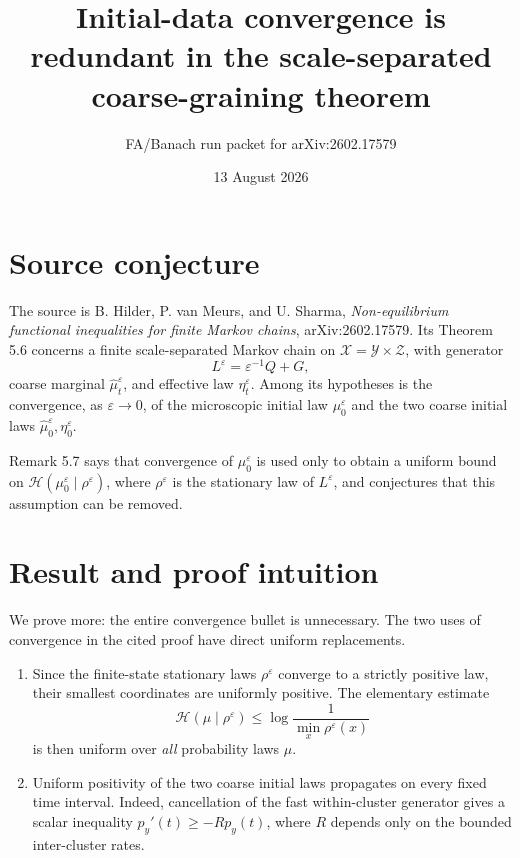 \documentclass[11pt]{article}
\title{Initial-data convergence is redundant in the scale-separated
coarse-graining theorem}
\author{FA/Banach run packet for arXiv:2602.17579}
\date{13 August 2026}
\newcommand{\Ent}{\mathcal H}
\newcommand{\X}{\mathcal X}
\newcommand{\Y}{\mathcal Y}
\newcommand{\Zs}{\mathcal Z}
\begin{document}
\maketitle

\section*{Source conjecture}

The source is B. Hilder, P. van Meurs, and U. Sharma,
\emph{Non-equilibrium functional inequalities for finite Markov chains},
arXiv:2602.17579. Its Theorem 5.6 concerns a finite scale-separated Markov
chain on \(\X=\Y\times\Zs\), with generator
\[
 L^\varepsilon=\varepsilon^{-1}Q+G,
\]
coarse marginal \(\widehat\mu_t^\varepsilon\), and effective law
\(\eta_t^\varepsilon\). Among its hypotheses is the convergence, as
\(\varepsilon\to0\), of the microscopic initial law
\(\mu_0^\varepsilon\) and the two coarse initial laws
\(\widehat\mu_0^\varepsilon,\eta_0^\varepsilon\).

Remark 5.7 says that convergence of \(\mu_0^\varepsilon\) is used only to
obtain a uniform bound on
\(\Ent(\mu_0^\varepsilon\mid\rho^\varepsilon)\), where
\(\rho^\varepsilon\) is the stationary law of \(L^\varepsilon\), and
conjectures that this assumption can be removed.

\section*{Result and proof intuition}

We prove more: the entire convergence bullet is unnecessary. The two uses of
convergence in the cited proof have direct uniform replacements.

\begin{enumerate}[leftmargin=2em]
\item Since the finite-state stationary laws \(\rho^\varepsilon\) converge to
a strictly positive law, their smallest coordinates are uniformly positive.
The elementary estimate
\[
 \Ent(\mu\mid\rho^\varepsilon)
 \leq \log\frac1{\min_x\rho^\varepsilon(x)}
\]
is then uniform over \emph{all} probability laws \(\mu\).
\item Uniform positivity of the two coarse initial laws propagates on every
fixed time interval. Indeed, cancellation of the fast within-cluster
generator gives a scalar inequality \(p_y'(t)\geq-Rp_y(t)\), where \(R\)
depends only on the bounded inter-cluster rates.
\end{enumerate}
\end{document}
